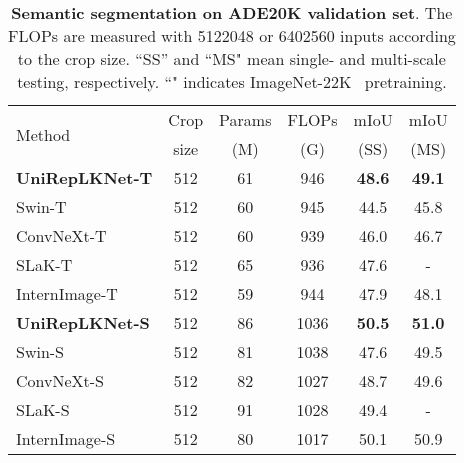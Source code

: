 \documentclass[10pt,twocolumn,letterpaper]{article}
\begin{document}
\begin{table}[t]
    \centering
    \setlength{\tabcolsep}{1.3mm}
    \footnotesize
    \caption{\textbf{Semantic segmentation on ADE20K validation set}. The FLOPs are measured with 5122048 or 6402560 inputs according to the crop size. ``SS'' and ``MS" mean single- and multi-scale testing, respectively. ``" indicates ImageNet-22K~\cite{deng2009imagenet} pretraining.}
    \vspace{-0.1in}
    \begin{tabular}{l|c|c|c|cc}
    \hline
    \multirow{2}{*}{Method} & Crop & Params & FLOPs & mIoU & mIoU\\
    	& size & (M)&(G) & (SS) & (MS)   \\
    \hline
    \rowcolor{gray!20}
    \textbf{UniRepLKNet-T}    &   512    & 61   &   946   &   \textbf{48.6}    &   \textbf{49.1}   \\ 
    	Swin-T~\cite{liu2021swin} & 512 & 60  & 945 & 44.5 & 45.8 \\
    	ConvNeXt-T~\cite{liu2022convnet} & 512 & 60 & 939 & 46.0 & 46.7 \\
    	SLaK-T~\cite{liu2022more} & 512 & 65 & 936 & 47.6 & - \\
    	InternImage-T~\cite{wang2023internimage} & 512 & 59 & 944 & 47.9 & 48.1  \\
     \rowcolor{gray!20}
     
    	\hline
     \rowcolor{gray!20}
        \textbf{UniRepLKNet-S}    &   512   &   86   &   1036   &   \textbf{50.5}    &   \textbf{51.0}   \\
        Swin-S~\cite{liu2021swin} & 512 & 81 &  1038 &  47.6 &  49.5 \\
        ConvNeXt-S~\cite{liu2022convnet}  & 512 &82 & 1027  & 48.7 & 49.6  \\
        SLaK-S~\cite{liu2022more} & 512 &91 & 1028 & 49.4 & - \\
        InternImage-S~\cite{wang2023internimage} & 512 & 80 & 1017 & 50.1 & 50.9 \\
        
        


\end{tabular}
\end{table}
\end{document}
